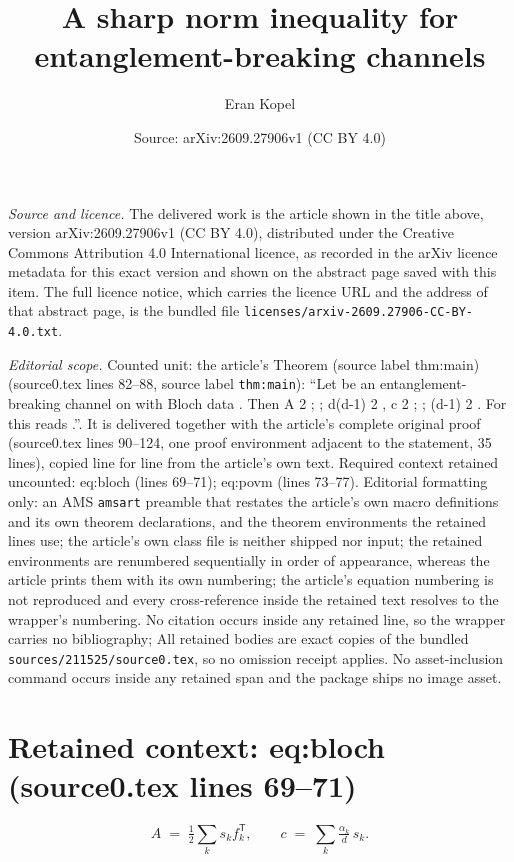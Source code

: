 \documentclass[10pt,a4paper]{amsart}
\title[A sharp norm inequality for entanglement-breaking channels]{A sharp norm inequality for entanglement-breaking channels}
\author{Eran Kopel}
\date{Source: arXiv:2609.27906v1 (CC BY 4.0)}
\theoremstyle{plain}
\theoremstyle{remark}
\begin{document}
\maketitle

\noindent\emph{Source and licence.} The delivered work is the article shown in the title above, version arXiv:2609.27906v1 (CC BY 4.0), distributed under the Creative Commons Attribution 4.0 International licence, as recorded in the arXiv licence metadata for this exact version and shown on the abstract page saved with this item. The full licence notice, which carries the licence URL and the address of that abstract page, is the bundled file \texttt{licenses/arxiv-2609.27906-CC-BY-4.0.txt}.
\par\smallskip

\noindent\textit{Editorial scope.} Counted unit: the article's Theorem (source label thm:main) (source0.tex lines 82--88, source label \texttt{thm:main}): ``Let be an entanglement-breaking channel on with Bloch data . Then A 2 ; ; d(d-1) 2 , c 2 ; ; (d-1) 2 . For this reads .''. It is delivered together with the article's complete original proof (source0.tex lines 90--124, one proof environment adjacent to the statement, 35 lines), copied line for line from the article's own text. Required context retained uncounted: eq:bloch (lines 69--71); eq:povm (lines 73--77). Editorial formatting only: an AMS \texttt{amsart} preamble that restates the article's own macro definitions and its own theorem declarations, and the theorem environments the retained lines use; the article's own class file is neither shipped nor input; the retained environments are renumbered sequentially in order of appearance, whereas the article prints them with its own numbering; the article's equation numbering is not reproduced and every cross-reference inside the retained text resolves to the wrapper's numbering. No citation occurs inside any retained line, so the wrapper carries no bibliography; All retained bodies are exact copies of the bundled \texttt{sources/211525/source0.tex}, so no omission receipt applies. No asset-inclusion command occurs inside any retained span and the package ships no image asset.


\section*{Retained context: eq:bloch (source0.tex lines 69--71)}

\begin{equation}\label{eq:bloch}
A \;=\; \tfrac12\sum_k s_k f_k^{\mathsf T}, \qquad c \;=\; \sum_k \tfrac{\alpha_k}{d}\,s_k .
\end{equation}
\end{document}
